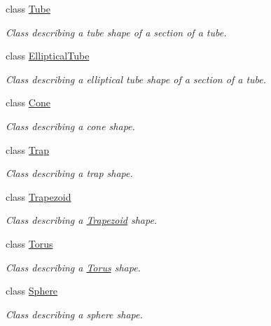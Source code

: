 \begin{DoxyCompactItemize}
class \hyperlink{class_d_d4hep_1_1_geometry_1_1_tube}{Tube}
\begin{DoxyCompactList}\small\item\em Class describing a tube shape of a section of a tube. \item\end{DoxyCompactList}\item 
class \hyperlink{class_d_d4hep_1_1_geometry_1_1_elliptical_tube}{EllipticalTube}
\begin{DoxyCompactList}\small\item\em Class describing a elliptical tube shape of a section of a tube. \item\end{DoxyCompactList}\item 
class \hyperlink{class_d_d4hep_1_1_geometry_1_1_cone}{Cone}
\begin{DoxyCompactList}\small\item\em Class describing a cone shape. \item\end{DoxyCompactList}\item 
class \hyperlink{class_d_d4hep_1_1_geometry_1_1_trap}{Trap}
\begin{DoxyCompactList}\small\item\em Class describing a trap shape. \item\end{DoxyCompactList}\item 
class \hyperlink{class_d_d4hep_1_1_geometry_1_1_trapezoid}{Trapezoid}
\begin{DoxyCompactList}\small\item\em Class describing a \hyperlink{class_d_d4hep_1_1_geometry_1_1_trapezoid}{Trapezoid} shape. \item\end{DoxyCompactList}\item 
class \hyperlink{class_d_d4hep_1_1_geometry_1_1_torus}{Torus}
\begin{DoxyCompactList}\small\item\em Class describing a \hyperlink{class_d_d4hep_1_1_geometry_1_1_torus}{Torus} shape. \item\end{DoxyCompactList}\item 
class \hyperlink{class_d_d4hep_1_1_geometry_1_1_sphere}{Sphere}
\begin{DoxyCompactList}\small\item\em Class describing a sphere shape. \item\end{DoxyCompactList}\item 

\end{DoxyCompactItemize}
